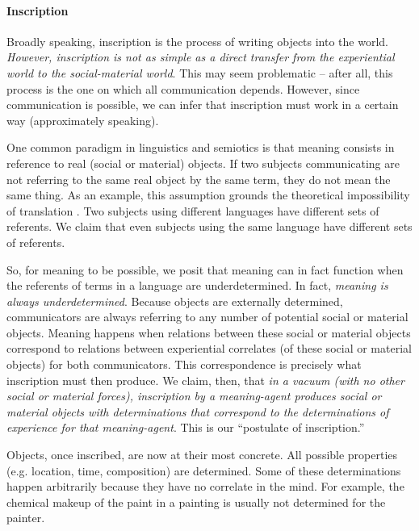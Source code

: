 \paragraph{Inscription}
Broadly speaking, inscription is the process of writing objects into the world. \textit{However, inscription is not as simple as a direct transfer from the experiential world to the social-material world}. This may seem problematic -- after all, this process is the one on which all communication depends. However, since communication is possible, we can infer that inscription must work in a certain way (approximately speaking).

One common paradigm in linguistics and semiotics is that meaning consists in reference to real (social or material) objects. If two subjects communicating are not referring to the same real object by the same term, they do not mean the same thing. As an example, this assumption grounds the theoretical impossibility of translation \citep{Quine:WordObject}. Two subjects using different languages have different sets of referents. We claim that even subjects using the same language have different sets of referents.

So, for meaning to be possible, we posit that meaning can in fact function when the referents of terms in a language are underdetermined. In fact, \textit{meaning is always underdetermined}. Because objects are externally determined, communicators are always referring to any number of potential social or material objects. Meaning happens when relations between these social or material objects correspond to relations between experiential correlates (of these social or material objects) for both communicators. This correspondence is precisely what inscription must then produce. We claim, then, that \textit{in a vacuum (with no other social or material forces), inscription by a meaning-agent produces social or material objects with determinations that correspond to the determinations of experience for that meaning-agent}. This is our ``postulate of inscription.''

Objects, once inscribed, are now at their most concrete. All possible properties (e.g. location, time, composition) are determined. Some of these determinations happen arbitrarily because they have no correlate in the mind. For example, the chemical makeup of the paint in a painting is usually not determined for the painter.

